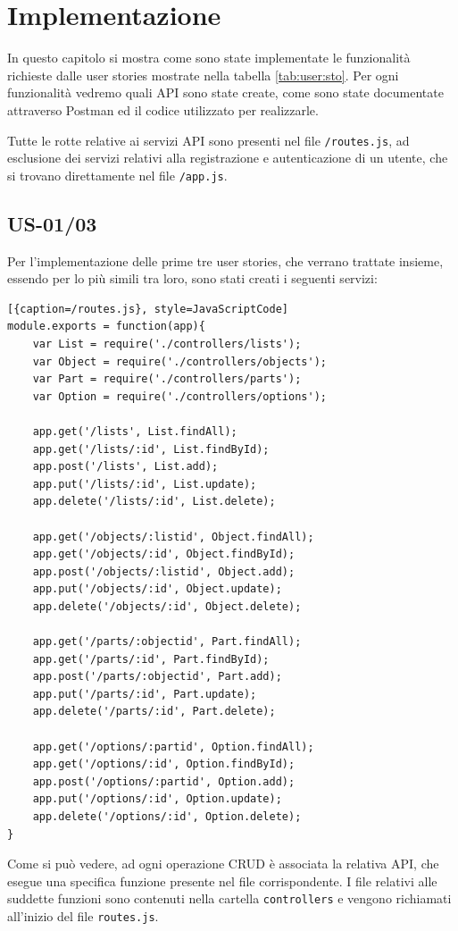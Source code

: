 \chapter{Implementazione}
\label{chap:implementazione}
In questo capitolo si mostra come sono state implementate le funzionalità richieste dalle user stories mostrate nella tabella \ref{tab:user:sto}.
Per ogni funzionalità vedremo quali API sono state create, come sono state documentate attraverso Postman ed il codice utilizzato per realizzarle.

Tutte le rotte relative ai servizi API sono presenti nel file \texttt{/routes.js}, ad esclusione dei servizi relativi alla registrazione e autenticazione di un utente, che si trovano direttamente nel file \texttt{/app.js}.
\section{US-01/03}
Per l'implementazione delle prime tre user stories, che verrano trattate insieme, essendo per lo più simili tra loro, sono stati creati i seguenti servizi:
\begin{lstlisting}[{caption=/routes.js}, style=JavaScriptCode]
module.exports = function(app){
	var List = require('./controllers/lists');
	var Object = require('./controllers/objects');
	var Part = require('./controllers/parts');
	var Option = require('./controllers/options');
	
	app.get('/lists', List.findAll);
	app.get('/lists/:id', List.findById);
	app.post('/lists', List.add);
	app.put('/lists/:id', List.update);
	app.delete('/lists/:id', List.delete);
	
	app.get('/objects/:listid', Object.findAll);
	app.get('/objects/:id', Object.findById);
	app.post('/objects/:listid', Object.add);
	app.put('/objects/:id', Object.update);
	app.delete('/objects/:id', Object.delete);
	
	app.get('/parts/:objectid', Part.findAll);
	app.get('/parts/:id', Part.findById);
	app.post('/parts/:objectid', Part.add);
	app.put('/parts/:id', Part.update);
	app.delete('/parts/:id', Part.delete);
	
	app.get('/options/:partid', Option.findAll);
	app.get('/options/:id', Option.findById);
	app.post('/options/:partid', Option.add);
	app.put('/options/:id', Option.update);
	app.delete('/options/:id', Option.delete);
}
\end{lstlisting}
Come si può vedere, ad ogni operazione CRUD è associata la relativa API, che esegue una specifica funzione presente nel file corrispondente. I file relativi alle suddette funzioni sono contenuti nella cartella \texttt{controllers} e vengono richiamati all'inizio del file \texttt{routes.js}.

